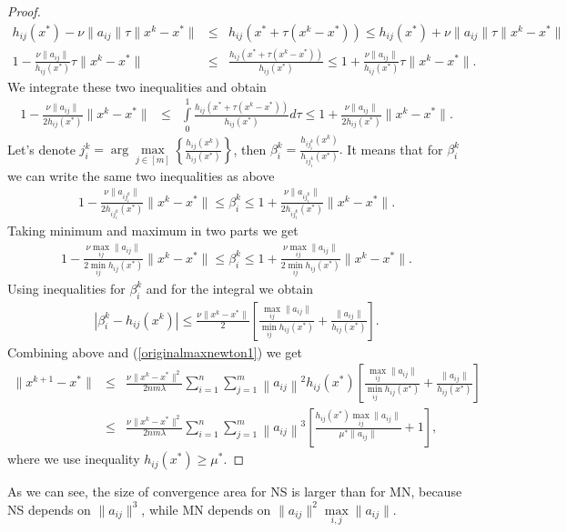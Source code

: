 \documentclass[10pt]{article}
\newcommand{\newalpha}{h}
\begin{document}
\begin{proof}
\begin{eqnarray*}
		\newalpha_{ij}(x^*) - \nu\|a_{ij}\|\tau\|x^k-x^*\| &\leq& \newalpha_{ij}(x^*+\tau(x^k-x^*)) \leq \newalpha_{ij}(x^*)+\nu\|a_{ij}\|\tau\|x^k-x^*\|\\
		1 - \frac{\nu\|a_{ij}\|}{\newalpha_{ij}(x^*)}\tau\|x^k-x^*\| &\leq& \frac{\newalpha_{ij}(x^*+\tau(x^k-x^*))}{\newalpha_{ij}(x^*)} \leq 1 + \frac{\nu\|a_{ij}\|}{\newalpha_{ij}(x^*)}\tau\|x^k-x^*\|.
	\end{eqnarray*} 
	We integrate these two inequalities and obtain
	\begin{eqnarray*}
		1 - \frac{\nu\|a_{ij}\|}{2\newalpha_{ij}(x^*)}\|x^k-x^*\| &\leq& \int\limits_0^1\frac{\newalpha_{ij}(x^*+\tau(x^k-x^*))}{\newalpha_{ij}(x^*)}d\tau \leq 1 + \frac{\nu\|a_{ij}\|}{2\newalpha_{ij}(x^*)}\|x^k-x^*\|.
	\end{eqnarray*}
	Let's denote $j_i^k =\arg \max\limits_{j\in[m]}\left\{\frac{\newalpha_{ij}(x^k)}{\newalpha_{ij}(x^*)}\right\}$, then $\beta_i^k = \frac{\newalpha_{ij^k_i}(x^k)}{\newalpha_{ij^k_i}(x^*)}.$ It means that for $\beta_i^k$ we can write the same two inequalities as above
	\begin{eqnarray*}
		1 - \frac{\nu\|a_{ij_i^k}\|}{2\newalpha_{ij_i^k}(x^*)}\|x^k-x^*\| \leq \beta_i^k \leq 1+ \frac{\nu\|a_{ij_i^k}\|}{2\newalpha_{ij_i^k}(x^*)}\|x^k-x^*\|.
	\end{eqnarray*}
	Taking minimum and maximum in two parts we get
	\begin{eqnarray*}
		1 - \frac{\nu\max\limits_{ij}\|a_{ij}\|}{2\min\limits_{ij}\newalpha_{ij}(x^*)}\|x^k-x^*\| \leq \beta_i^k \leq 1 + \frac{\nu\max\limits_{ij}\|a_{ij}\|}{2\min\limits_{ij}\newalpha_{ij}(x^*)}\|x^k-x^*\|.
	\end{eqnarray*}
	Using inequalities for $\beta_i^k$ and for the integral we obtain
	\begin{eqnarray*}
		\left|\beta_i^k-\newalpha_{ij}(x^k)\right| \leq \frac{\nu\|x^k-x^*\|}{2}\left[\frac{\max\limits_{ij}\|a_{ij}\|}{\min\limits_{ij}\newalpha_{ij}(x^*)}+ \frac{\|a_{ij}\|}{\newalpha_{ij}(x^*)}\right].
	\end{eqnarray*}
	Combining above and (\ref{originalmaxnewton1}) we get
	\begin{eqnarray*}
		\|x^{k+1}-x^*\| &\leq&  \frac{\nu\|x^k-x^*\|^2}{2nm\lambda}\sum\limits_{i=1}^n\sum\limits_{j=1}^m\left\|a_{ij}\right\|^2\newalpha_{ij}(x^*)\left[\frac{\max\limits_{ij}\|a_{ij}\|}{\min\limits_{ij}\newalpha_{ij}(x^*)}+ \frac{\|a_{ij}\|}{\newalpha_{ij}(x^*)}\right]\\
		&\leq& \frac{\nu\|x^k-x^*\|^2}{2nm\lambda}\sum\limits_{i=1}^n\sum\limits_{j=1}^m\left\|a_{ij}\right\|^3\left[\frac{\newalpha_{ij}(x^*)\max\limits_{ij}\|a_{ij}\|}{\mu^*\|a_{ij}\|}+ 1\right],
	\end{eqnarray*}
	where we use inequality $\newalpha_{ij}(x^*) \geq \mu^*$.
\end{proof}

As we can see, the size of convergence area for {\sf NS} is larger than for {\sf MN}, because {\sf NS} depends on $\|a_{ij}\|^3$, while {\sf MN} depends on $\|a_{ij}\|^2\max\limits_{i,j}\|a_{ij}\|$. 
\end{document}
